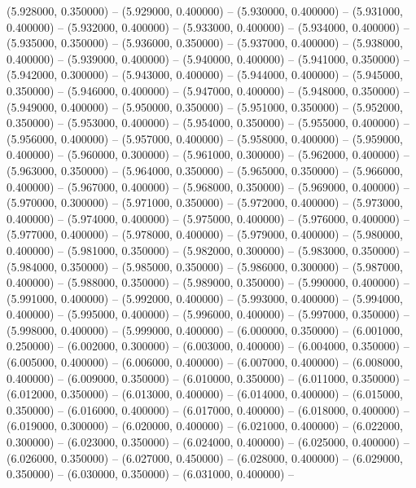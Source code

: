 (5.928000, 0.350000) -- 
(5.929000, 0.400000) -- 
(5.930000, 0.400000) -- 
(5.931000, 0.400000) -- 
(5.932000, 0.400000) -- 
(5.933000, 0.400000) -- 
(5.934000, 0.400000) -- 
(5.935000, 0.350000) -- 
(5.936000, 0.350000) -- 
(5.937000, 0.400000) -- 
(5.938000, 0.400000) -- 
(5.939000, 0.400000) -- 
(5.940000, 0.400000) -- 
(5.941000, 0.350000) -- 
(5.942000, 0.300000) -- 
(5.943000, 0.400000) -- 
(5.944000, 0.400000) -- 
(5.945000, 0.350000) -- 
(5.946000, 0.400000) -- 
(5.947000, 0.400000) -- 
(5.948000, 0.350000) -- 
(5.949000, 0.400000) -- 
(5.950000, 0.350000) -- 
(5.951000, 0.350000) -- 
(5.952000, 0.350000) -- 
(5.953000, 0.400000) -- 
(5.954000, 0.350000) -- 
(5.955000, 0.400000) -- 
(5.956000, 0.400000) -- 
(5.957000, 0.400000) -- 
(5.958000, 0.400000) -- 
(5.959000, 0.400000) -- 
(5.960000, 0.300000) -- 
(5.961000, 0.300000) -- 
(5.962000, 0.400000) -- 
(5.963000, 0.350000) -- 
(5.964000, 0.350000) -- 
(5.965000, 0.350000) -- 
(5.966000, 0.400000) -- 
(5.967000, 0.400000) -- 
(5.968000, 0.350000) -- 
(5.969000, 0.400000) -- 
(5.970000, 0.300000) -- 
(5.971000, 0.350000) -- 
(5.972000, 0.400000) -- 
(5.973000, 0.400000) -- 
(5.974000, 0.400000) -- 
(5.975000, 0.400000) -- 
(5.976000, 0.400000) -- 
(5.977000, 0.400000) -- 
(5.978000, 0.400000) -- 
(5.979000, 0.400000) -- 
(5.980000, 0.400000) -- 
(5.981000, 0.350000) -- 
(5.982000, 0.300000) -- 
(5.983000, 0.350000) -- 
(5.984000, 0.350000) -- 
(5.985000, 0.350000) -- 
(5.986000, 0.300000) -- 
(5.987000, 0.400000) -- 
(5.988000, 0.350000) -- 
(5.989000, 0.350000) -- 
(5.990000, 0.400000) -- 
(5.991000, 0.400000) -- 
(5.992000, 0.400000) -- 
(5.993000, 0.400000) -- 
(5.994000, 0.400000) -- 
(5.995000, 0.400000) -- 
(5.996000, 0.400000) -- 
(5.997000, 0.350000) -- 
(5.998000, 0.400000) -- 
(5.999000, 0.400000) -- 
(6.000000, 0.350000) -- 
(6.001000, 0.250000) -- 
(6.002000, 0.300000) -- 
(6.003000, 0.400000) -- 
(6.004000, 0.350000) -- 
(6.005000, 0.400000) -- 
(6.006000, 0.400000) -- 
(6.007000, 0.400000) -- 
(6.008000, 0.400000) -- 
(6.009000, 0.350000) -- 
(6.010000, 0.350000) -- 
(6.011000, 0.350000) -- 
(6.012000, 0.350000) -- 
(6.013000, 0.400000) -- 
(6.014000, 0.400000) -- 
(6.015000, 0.350000) -- 
(6.016000, 0.400000) -- 
(6.017000, 0.400000) -- 
(6.018000, 0.400000) -- 
(6.019000, 0.300000) -- 
(6.020000, 0.400000) -- 
(6.021000, 0.400000) -- 
(6.022000, 0.300000) -- 
(6.023000, 0.350000) -- 
(6.024000, 0.400000) -- 
(6.025000, 0.400000) -- 
(6.026000, 0.350000) -- 
(6.027000, 0.450000) -- 
(6.028000, 0.400000) -- 
(6.029000, 0.350000) -- 
(6.030000, 0.350000) -- 
(6.031000, 0.400000) -- 
